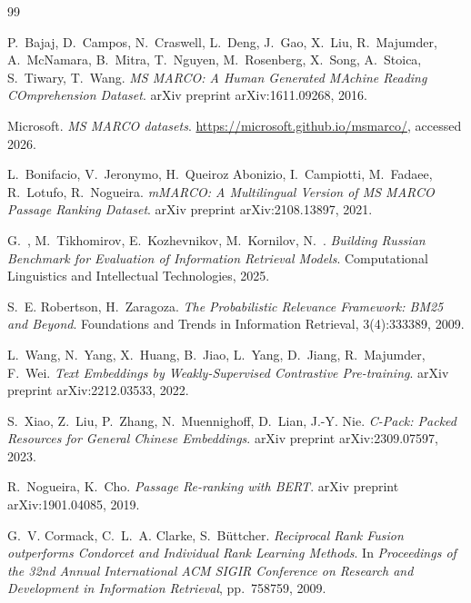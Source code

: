 \documentclass[10pt,a4paper,twocolumn]{article}
\begin{document}
\clearpage
\begin{thebibliography}{99}

P.~Bajaj, D.~Campos, N.~Craswell, L.~Deng, J.~Gao, X.~Liu, R.~Majumder, A.~McNamara, B.~Mitra, T.~Nguyen, M.~Rosenberg, X.~Song, A.~Stoica, S.~Tiwary, T.~Wang.
\newblock \textit{MS MARCO: A Human Generated MAchine Reading COmprehension Dataset}.
\newblock arXiv preprint arXiv:1611.09268, 2016.

Microsoft.
\newblock \textit{MS MARCO datasets}.
\newblock \url{https://microsoft.github.io/msmarco/}, accessed 2026.

L.~Bonifacio, V.~Jeronymo, H.~Queiroz Abonizio, I.~Campiotti, M.~Fadaee, R.~Lotufo, R.~Nogueira.
\newblock \textit{mMARCO: A Multilingual Version of MS MARCO Passage Ranking Dataset}.
\newblock arXiv preprint arXiv:2108.13897, 2021.

G.~, M.~Tikhomirov, E.~Kozhevnikov, M.~Kornilov, N.~.
\newblock \textit{Building Russian Benchmark for Evaluation of Information Retrieval Models}.
\newblock Computational Linguistics and Intellectual Technologies, 2025.

S.~E. Robertson, H.~Zaragoza.
\newblock \textit{The Probabilistic Relevance Framework: BM25 and Beyond}.
\newblock Foundations and Trends in Information Retrieval, 3(4):333\textendash{}389, 2009.

L.~Wang, N.~Yang, X.~Huang, B.~Jiao, L.~Yang, D.~Jiang, R.~Majumder, F.~Wei.
\newblock \textit{Text Embeddings by Weakly-Supervised Contrastive Pre-training}.
\newblock arXiv preprint arXiv:2212.03533, 2022.

S.~Xiao, Z.~Liu, P.~Zhang, N.~Muennighoff, D.~Lian, J.-Y. Nie.
\newblock \textit{C-Pack: Packed Resources for General Chinese Embeddings}.
\newblock arXiv preprint arXiv:2309.07597, 2023.

R.~Nogueira, K.~Cho.
\newblock \textit{Passage Re-ranking with BERT}.
\newblock arXiv preprint arXiv:1901.04085, 2019.

G.~V. Cormack, C.~L.~A. Clarke, S.~B{\"u}ttcher.
\newblock \textit{Reciprocal Rank Fusion outperforms Condorcet and Individual Rank Learning Methods}.
\newblock In \textit{Proceedings of the 32nd Annual International ACM SIGIR Conference on Research and Development in Information Retrieval}, pp.~758\textendash{}759, 2009.


\end{thebibliography}
\end{document}
